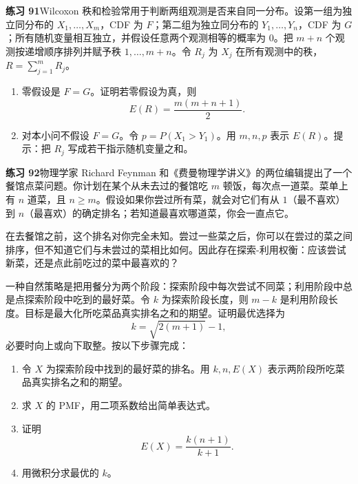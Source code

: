 \documentclass[UTF8, 12pt, fontset=fandol, oneside]{ctexart}
\begin{document}
\noindent\textbf{练习 91}\quad Wilcoxon 秩和检验常用于判断两组观测是否来自同一分布。设第一组为独立同分布的 $X_1,\ldots,X_m$，CDF 为 $F$；第二组为独立同分布的 $Y_1,\ldots,Y_n$，CDF 为 $G$；所有随机变量相互独立，并假设任意两个观测相等的概率为 $0$。把 $m+n$ 个观测按递增顺序排列并赋予秩 $1,\ldots,m+n$。令 $R_j$ 为 $X_j$ 在所有观测中的秩，$R=\sum_{j=1}^m R_j$。
\begin{enumerate}
  \item[(a)] 零假设是 $F=G$。证明若零假设为真，则
  \[
    E(R)=\frac{m(m+n+1)}{2}.
  \]
  \item[(b)] 对本小问不假设 $F=G$。令 $p=P(X_1>Y_1)$。用 $m,n,p$ 表示 $E(R)$。提示：把 $R_j$ 写成若干指示随机变量之和。
\end{enumerate}

\noindent\textbf{练习 92}\quad 物理学家 Richard Feynman 和《费曼物理学讲义》的两位编辑提出了一个餐馆点菜问题。你计划在某个从未去过的餐馆吃 $m$ 顿饭，每次点一道菜。菜单上有 $n$ 道菜，且 $n\ge m$。假设如果你尝过所有菜，就会对它们有从 $1$（最不喜欢）到 $n$（最喜欢）的确定排名；若知道最喜欢哪道菜，你会一直点它。

在去餐馆之前，这个排名对你完全未知。尝过一些菜之后，你可以在尝过的菜之间排序，但不知道它们与未尝过的菜相比如何。因此存在探索-利用权衡：应该尝试新菜，还是点此前吃过的菜中最喜欢的？

一种自然策略是把用餐分为两个阶段：探索阶段中每次尝试不同菜；利用阶段中总是点探索阶段中吃到的最好菜。令 $k$ 为探索阶段长度，则 $m-k$ 是利用阶段长度。目标是最大化所吃菜品真实排名之和的期望。证明最优选择为
\[
  k=\sqrt{2(m+1)}-1,
\]
必要时向上或向下取整。按以下步骤完成：
\begin{enumerate}
  \item[(a)] 令 $X$ 为探索阶段中找到的最好菜的排名。用 $k,n,E(X)$ 表示两阶段所吃菜品真实排名之和的期望。
  \item[(b)] 求 $X$ 的 PMF，用二项系数给出简单表达式。
  \item[(c)] 证明
  \[
    E(X)=\frac{k(n+1)}{k+1}.
  \]
  \item[(d)] 用微积分求最优的 $k$。
\end{enumerate}
\end{document}
